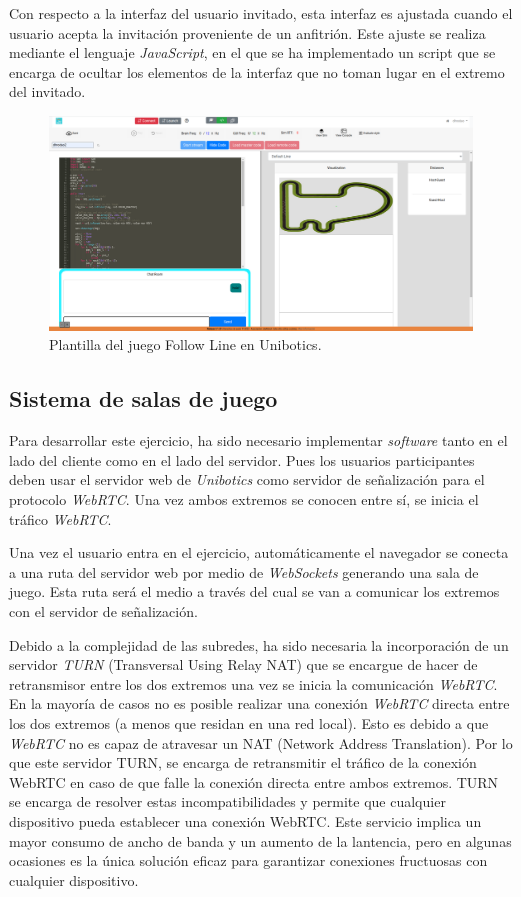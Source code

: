 \documentclass[a4paper, 12pt]{book}
\begin{document}
Con respecto a la interfaz del usuario invitado, esta interfaz es ajustada cuando el usuario acepta la invitación proveniente de un anfitrión. Este ajuste se realiza mediante el lenguaje \emph{JavaScript}, en el que se ha implementado un script que se encarga de ocultar los elementos de la interfaz que no toman lugar en el extremo del invitado.
\begin{figure}[H]
	\centering
    \includegraphics[width=15cm]{img/follow_line_game_sync.png}
    \caption{Plantilla del juego Follow Line en Unibotics.}
    \label{figura:diagrama_conexion_webrtc}
\end{figure}

\subsection{Sistema de salas de juego}

Para desarrollar este ejercicio, ha sido necesario implementar \emph{software} tanto en el lado del cliente como en el lado del servidor. Pues los usuarios participantes deben usar el servidor web de \emph{Unibotics} como servidor de señalización para el protocolo \emph{WebRTC}. Una vez ambos extremos se conocen entre sí, se inicia el tráfico \emph{WebRTC}.

Una vez el usuario entra en el ejercicio, automáticamente el navegador se conecta a una ruta del servidor web por medio de \emph{WebSockets} generando una sala de juego. Esta ruta será el medio a través del cual se van a comunicar los extremos con el servidor de señalización.

Debido a la complejidad de las subredes, ha sido necesaria la incorporación de un servidor \emph{TURN} (Transversal Using Relay NAT) que se encargue de hacer de retransmisor entre los dos extremos una vez se inicia la comunicación \emph{WebRTC}. En la mayoría de casos no es posible realizar una conexión \emph{WebRTC} directa entre los dos extremos (a menos que residan en una red local). Esto es debido a que \emph{WebRTC} no es capaz de atravesar un NAT (Network Address Translation). Por lo que este servidor TURN, se encarga de retransmitir el tráfico de la conexión WebRTC en caso de que falle la conexión directa entre ambos extremos. TURN se encarga de resolver estas incompatibilidades y permite que cualquier dispositivo pueda establecer una conexión WebRTC. Este servicio implica un mayor consumo de ancho de banda y un aumento de la lantencia, pero en algunas ocasiones es la única solución eficaz para garantizar conexiones fructuosas con cualquier dispositivo.
\end{document}
